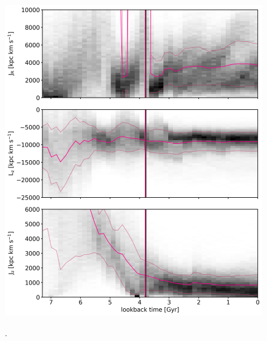 \begin{figure}[htbp]
\captionsetup{format=plain}
    \centering
	\includegraphics[width=\textwidth]{plots/Dynamics/prog2/action_time_evolution_hist_mean.png}
	\label{fig:time_ev_all_GCs}
	\caption{.}
\end{figure}

